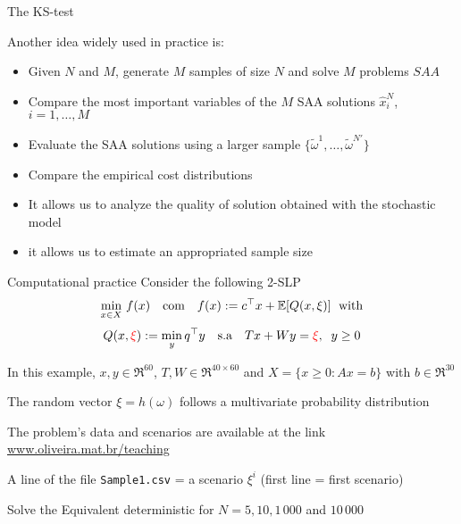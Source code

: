 \begin{frame}{The KS-test}

Another idea widely used in practice is:
\begin {itemize}
\item Given $ N $ and $ M $, generate $ M $  samples of size $ N $ and solve $ M $ problems $ SAA $
\pula

\item Compare the most important variables of the $ M $  SAA solutions $ \hat x^N_i$, $ i = 1, \ldots, M$
\pula

\item Evaluate the SAA solutions using a larger sample $\{ \tilde \omega^1, \ldots, \tilde \omega^{N'} \}$
\pula

\item Compare the empirical cost distributions
\end{itemize}
\pula


\pula
{}
\begin{itemize}
\item It allows  us to analyze the quality of solution obtained with the stochastic model
\pula

\item it allows us to estimate an appropriated sample size
\end{itemize}
\end{frame}

\begin{frame}{Computational practice}
Consider the following 2-SLP\[
 \min_{x \in  X}\,f(x)\quad\mbox{com}\quad f(x):=c^\top  x + \mathbb{E}[Q(x, \xi)]\; \mbox{ with}
\]
\[
 Q(x, {\color{red}\xi}):=\min_{y} q^{\top}  y \quad \mbox{s.a} \quad Tx + Wy ={\color{red}\xi},\;\; y\geq 0
\]

In this example, $x,y \in \Re^{60}$, $T,W \in \Re^{40\times 60}$ and $X=\{x\geq0: Ax=b\}$ with $b \in \Re^{30}$
\pula

The random vector $\xi=h(\omega)$ follows a multivariate probability distribution
\pula

The problem's data and scenarios are available at the link \url{www.oliveira.mat.br/teaching}
\pula

A line of the file {\tt Sample1.csv}  = a scenario $\xi^i$  (first line = first scenario)

\pula Solve the Equivalent deterministic for $N = 5, 10, 1\,000$ and $10\,000$
\end{frame}


